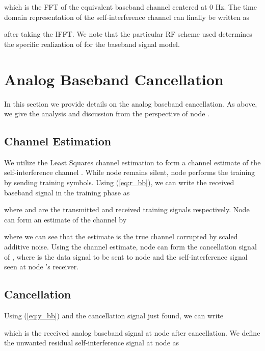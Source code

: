 \documentclass[12pt, journal,draftcls,letterpaper,onecolumn]{IEEEtran}
\begin{document}
which is the FFT of the equivalent baseband channel centered at 0 Hz.  The time domain representation of the self-interference channel can finally be written as

after taking the IFFT.  We note that the particular RF scheme used determines the specific realization of  for the baseband signal model.  


\section{Analog Baseband Cancellation}
\label{sec:self_int_canc}
In this section we provide details on the analog baseband cancellation.  As above, we give the analysis and discussion from the perspective of node .  
\subsection{Channel Estimation}
We utilize the Least Squares channel estimation to form a channel estimate of the self-interference channel .  While node  remains silent, node  performs the training by sending  training symbols.  Using (\ref{eq:r_bb}), we can write the received baseband signal in the training phase as

where  and  are the transmitted and received training signals respectively.  Node  can form an estimate of the channel by 

where we can see that the estimate  is the true channel corrupted by scaled additive noise.  Using the channel estimate, node  can form the cancellation signal of , where  is the data signal to be sent to node  and the self-interference signal seen at node 's receiver. 

\subsection{Cancellation}
Using (\ref{eq:y_bb}) and the cancellation signal just found, we can write

which is the received analog baseband signal at node  after cancellation.  We define the unwanted residual self-interference signal at node  as
\end{document}
